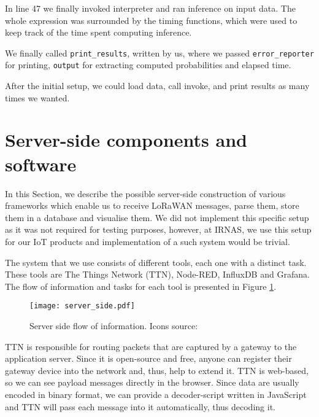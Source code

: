 \clearpage
In line 47 we finally invoked interpreter and ran inference on input data.
The whole expression was surrounded by the timing functions, which were used to keep track of the time spent computing inference.

We finally called \verb|print_results|, written by us, where we passed \verb|error_reporter| for printing, \verb|output| for extracting computed probabilities and elapsed time.

After the initial setup, we could load data, call invoke, and print results as many times we wanted.


\section{ Server-side components and software}

In this Section, we describe the possible server-side construction of various frameworks which enable us to receive LoRaWAN messages, parse them, store them in a database and visualise them.
We did not implement this specific setup as it was not required for testing purposes, however, at IRNAS, we use this setup for our IoT products and implementation of a such system would be trivial.

The system that we use consists of different tools, each one with a distinct task.
These tools are The Things Network (TTN), Node-RED, InfluxDB and Grafana.
The flow of information and tasks for each tool is presented in Figure \ref{server_side}.
\newline
\begin{figure}[ht]
    \centering
    \texttt{[image: server\_side.pdf]} 
    \caption[Server side flow of information.]{Server side flow of information. Icons source:\cite{icons}}
    \label{server_side}
\end{figure}

TTN is responsible for routing packets that are captured by a gateway to the application server.
Since it is open-source and free, anyone can register their gateway device into the network and, thus, help to extend it.
TTN is web-based, so we can see payload messages directly in the browser.
Since data are usually encoded in binary format, we can provide a decoder-script written in JavaScript and TTN will pass each message into it automatically, thus decoding it.

